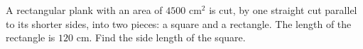 A rectangular plank with an area of $4500\text{ cm}^2$ is cut, by one straight cut parallel to its shorter sides, into two pieces: a square and a rectangle. The length of the rectangle is $120$ cm. Find the side length of the square.
